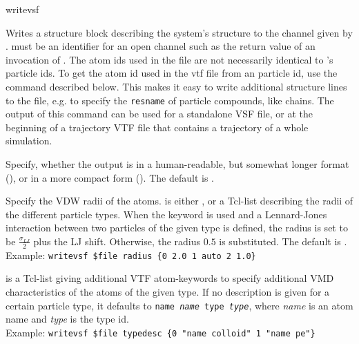 \begin{essyntax}
  writevsf  
\end{essyntax}
Writes a structure block describing the system's structure to the
channel given by .  must be an
identifier for an open channel such as the return value of an
invocation of . The atom ids used in the file are not
necessarily identical to \es's particle ids. To get the atom id used
in the vtf file from an \es particle id, use the command
 described below. This makes it easy to write
additional structure lines to the file, e.g. to specify the
\texttt{resname} of particle compounds, like chains.  The output of
this command can be used for a standalone VSF file, or at the
beginning of a trajectory VTF file that contains a trajectory of a
whole simulation.

\begin{arguments}
\item[\opt{\alt{short \asep verbose}}]
  Specify, whether the output is in a human-readable, but somewhat
  longer format (), or in a more compact form
  (). The default is .
  
\item[\opt{radius \alt{\var{radii} \asep auto}}] 
  Specify the VDW radii of the atoms.  is either
  , or a Tcl-list describing the radii of the different
  particle types. When the keyword  is used and a
  Lennard-Jones interaction between two particles of the given type is
  defined, the radius is set to be $\frac{\sigma_{LJ}}{2}$ plus the LJ
  shift.  Otherwise, the radius $0.5$ is substituted. The default is
  .\\
  Example: \verb!writevsf $file radius {0 2.0 1 auto 2 1.0}!
\item[\opt{typedesc \var{typedesc}}]
   is a Tcl-list giving additional VTF atom-keywords to
  specify additional VMD characteristics of the atoms of the given type.
  If no description is given for a certain particle type, it defaults to
  \texttt{name \textit{name} type \textit{type}}, where \textit{name}
  is an atom name and \textit{type} is the type id.\\
  Example: \verb!writevsf $file typedesc {0 "name colloid" 1 "name pe"}!
\end{arguments}

